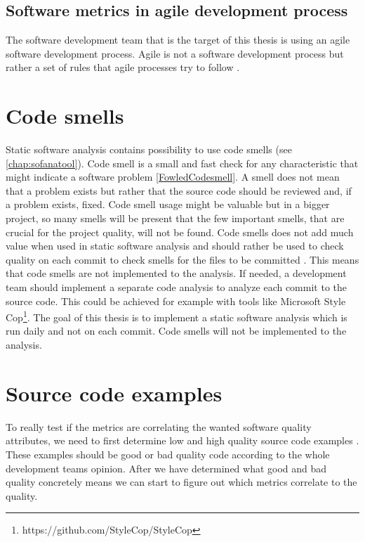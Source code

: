 \subsection{Software metrics in agile development process}

The software development team that is the target of this thesis is using an agile software development process. Agile is not a software development process but rather a set of rules that agile processes try to follow \cite{agilemanifesto}.

\section{Code smells}

Static software analysis contains possibility to use code smells (see \autoref{chap:sofanatool}). Code smell is a small and fast check for any characteristic that might indicate a software problem \ref{FowledCodesmell}. A smell does not mean that a problem exists but rather that the source code should be reviewed and, if a problem exists, fixed. Code smell usage might be valuable but in a bigger project, so many smells will be present that the few important smells, that are crucial for the project quality, will not be found. Code smells does not add much value when used in static software analysis and should rather be used to check quality on each commit to check smells for the files to be committed \cite{tufano2015and}. This means that code smells are not implemented to the analysis. If needed, a development team should implement a separate code analysis to analyze each commit to the source code. This could be achieved for example with tools like Microsoft Style Cop\footnote{https://github.com/StyleCop/StyleCop}. The goal of this thesis is to implement a static software analysis which is run daily and not on each commit. Code smells will not be implemented to the analysis. 

\section{Source code examples}
To really test if the metrics are correlating the wanted software quality attributes, we need to first determine low and high quality source code examples \cite{coleman1994using}. These examples should be good or bad quality code according to the whole development teams opinion. After we have determined what good and bad quality concretely means we can start to figure out which metrics correlate to the quality. 

